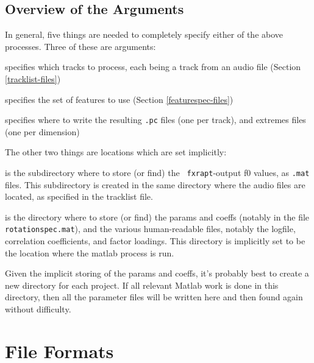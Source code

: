 \documentclass[11pt]{article}
\begin{document}
\subsection{Overview of the Arguments}   \label{arguments}

In general,  five things are  needed to completely specify either
of the above processes.  Three of these are arguments:

\begin{description}  \setlength{\itemsep}{0pt}\setlength{\parskip}{0pt}
\item[tracklist] specifies which tracks to process, each being a
  track from an audio file (Section \ref{tracklist-files})
\item[featurespec file]  specifies the set of features to use (Section \ref{featurespec-files})
\item[output dir] specifies where to write the resulting {\tt .pc}
  files (one per track), and extremes files (one per dimension)
\end{description}

The other two things are locations which are set implicitly:

\begin{description}  \setlength{\itemsep}{0pt}\setlength{\parskip}{0pt}
\item[pitch cache] is the subdirectory where to store (or find) the {\tt
  fxrapt}-output f0 values, as {\tt .mat} files.  This subdirectory is
  created in the same directory where the audio files are located, as
  specified in the tracklist file.
\item[parameter dir] is the directory where to store (or find) the
  params and coeffs (notably in the file {\tt rotationspec.mat}), and
  the various human-readable files, notably the logfile, correlation
  coefficients, and factor loadings.  This directory is implicitly set
  to be the location where the matlab process is run.
\end{description}

Given the implicit storing of the params and coeffs, it's probably
best to create a new directory for each project.  If all relevant
Matlab work is done in this directory, then all the parameter files
will be written here and then found again without difficulty.


\section{File Formats}        \label{sec:file-formats}
\end{document}
